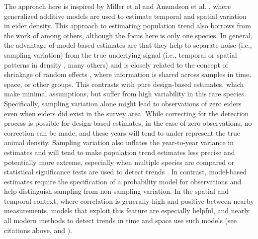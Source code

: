 \documentclass[
  10pt,
  letterpaper,
]{article}
\begin{document}
The approach here is inspired by Miller et al \citep{miller2013} and
Amundson et al. \citep{amundson2019}, where generalized additive models
\citep{hastie1986generalized, wood2017} are used to estimate
temporal and spatial variation in eider density. This approach to
estimating population trend also borrows from the work of
\citep{sauer2002hierarchical, rosenberg2019decline, smith2021north} among others, although the focus here is only one species. In general, the advantage of model-based estimates are that they help to separate noise (i.e., sampling variation) from the true underlying signal (i.e., temporal or spatial patterns in density \citep{BDA3, hooten2015guide}, many others) and is closely related to the concept of shrinkage of random effects
\citep{efron1977stein, BDA3}, where information is shared across
samples in time, space, or other groups. This contrasts with pure
design-based estimates, which make minimal assumptions, but suffer from
high variability in this rare species. Specifically, sampling variation
alone might lead to observations of zero eiders even when eiders did
exist in the survey area. While correcting for the detection process is
possible for design-based estimates, in the case of zero observations,
no correction can be made, and these years will tend to under represent
the true animal density. Sampling variation also inflates the
year-to-year variance in estimates and will tend to make population
trend estimates less precise and potentially more extreme, especially
when multiple species are compared or statistical significance tests are
used to detect trends \citep{sauer2002hierarchical}. In contrast,
model-based estimates require the specification of a probability model
for observations and help distinguish sampling from non-sampling
variation. In the spatial and temporal context, where correlation is
generally high and positive between nearby measurements, models that
exploit this feature are especially helpful, and nearly all modern
methods to detect trends in time and space use such models (see
citations above, and \citep{kery2015applied, kery2020applied}).
\end{document}
